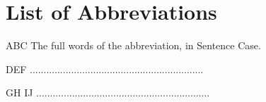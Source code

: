 \chapter*{List of Abbreviations}

\begin{leftitemize}
    \item[ABC] The full words of the abbreviation, in Sentence Case.
    \item[DEF] ...............................................................
    \item[GH IJ] ...............................................................
\end{leftitemize}

\clearpage
